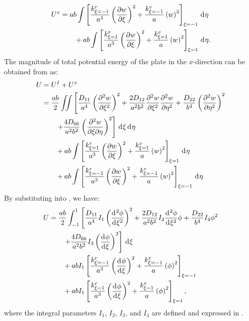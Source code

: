 \documentclass[preprint,12pt,number]{elsarticle}
\newcommand{\id}{\mathrm{d}\mkern1mu}
\begin{document}
%
\begin{equation}\label{eq:poten_energy_edgex2}
\begin{split}
	U^{x} &= ab \int\left[\frac{k^r_{\xi=-1}}{a^3} \left( \frac{\partial w}{\partial \xi} \right)^2 + \frac{k^v_{\xi=-1}}{a} \left( w \right)^2\right]_{\xi=-1} \, \id \eta \\
	&\qquad + ab \int\left[\frac{k^r_{\xi=1}}{a^3} \left( \frac{\partial w}{\partial \xi} \right)^2 + \frac{k^v_{\xi=1}}{a} \left( w \right)^2\right]_{\xi=1} \, \id \eta.
\end{split}
\end{equation}
%
The magnitude of total potential energy of the plate in the $x$-direction can be obtained from  as:
%
\begin{equation}\label{eq:poten_energy_tolx}
\begin{split}
	U &= U^{I} + U^{x} \\
	&= \frac{ab}{2} \iint \left[ \frac{D_{11}}{a^4} \left( \frac{\partial^2 w}{\partial \xi^2} \right)^2 + \frac{2 D_{12}}{a^2 b^2} \frac{\partial^2 w}{\partial \xi^2} \frac{\partial^2 w}{\partial \eta^2} + \frac{D_{22}}{b^4} \left( \frac{\partial^2 w}{\partial \eta^2} \right)^2 \right. \\
	&\qquad \left.  + \frac{4 D_{66}}{a^2 b^2} \left( \frac{\partial^2 w}{\partial \xi \partial \eta} \right)^2 \right] \, \id\xi \, \id\eta \\
	&\qquad + ab \int \left[\frac{k^r_{\xi=1}}{a^3} \left( \frac{\partial w}{\partial \xi} \right)^2 + \frac{k^v_{\xi=1}}{a} \left( w \right)^2 \right]_{\xi=1} \, \id \eta \\
	&\qquad + ab \int \left[\frac{k^r_{\xi=-1}}{a^3} \left( \frac{\partial w}{\partial \xi} \right)^2 + \frac{k^v_{\xi=-1}}{a} \left( w \right)^2 \right]_{\xi=-1} \, \id \eta
\end{split}
\end{equation}
%
By substituting  into , we have:
%
\begin{equation}\label{eq:poten_energy_tolx2}
\begin{split}
	U&=\frac{ab}{2} \int_{-1}^{1} \left[ \frac{D_{11}}{a^4}I_1 \left( \frac{\id^2\phi }{\id \xi^2} \right)^2 + \frac{2 D_{12}}{a^2 b^2}I_2 \frac{\id^2\phi }{\id \xi^2}\phi  + \frac{D_{22}}{b^4}I_4  \phi^2 \right. \\
	&\qquad \left. + \frac{4 D_{66}}{a^2 b^2}I_3 \left( \frac{\id \phi }{\id \xi}\right)^2 \right] \, \id\xi \\
	&\qquad + abI_1 \left[\frac{k^r_{\xi=-1}}{a^3} \left( \frac{\id \phi}{\id \xi} \right)^2+ \frac{k^v_{\xi=-1}}{a} \left( \phi \right)^2\right]_{\xi=-1}\\
	&\qquad + abI_1 \left[\frac{k^r_{\xi=1}}{a^3} \left( \frac{\id \phi}{\id \xi} \right)^2+ \frac{k^v_{\xi=1}}{a} \left( \phi \right)^2\right]_{\xi=1},
\end{split}
\end{equation}
%
where the integral parameters $I_1$, $I_2$, $I_3$, and $ I_4$ are defined and expressed in .
\end{document}
